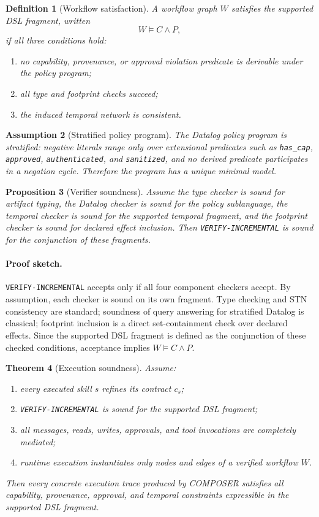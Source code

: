 \documentclass[11pt]{article}
\newtheorem{definition}{Definition}[section]
\newtheorem{assumption}[definition]{Assumption}
\newtheorem{proposition}[definition]{Proposition}
\newtheorem{theorem}[definition]{Theorem}
\begin{document}
\begin{definition}[Workflow satisfaction]
A workflow graph $W$ satisfies the supported DSL fragment, written
\[
W \models C \land P,
\]
if all three conditions hold:
\begin{enumerate}
\item no capability, provenance, or approval violation predicate is derivable under the policy program;
\item all type and footprint checks succeed;
\item the induced temporal network is consistent.
\end{enumerate}
\end{definition}

\begin{assumption}[Stratified policy program]
The Datalog policy program is stratified: negative literals range only over extensional predicates such as \texttt{has\_cap}, \texttt{approved}, \texttt{authenticated}, and \texttt{sanitized}, and no derived predicate participates in a negation cycle. Therefore the program has a unique minimal model.
\end{assumption}

\begin{proposition}[Verifier soundness]
Assume the type checker is sound for artifact typing, the Datalog checker is sound for the policy sublanguage, the temporal checker is sound for the supported temporal fragment, and the footprint checker is sound for declared effect inclusion. Then \texttt{VERIFY-INCREMENTAL} is sound for the conjunction of these fragments.
\end{proposition}

\paragraph{Proof sketch.}
\texttt{VERIFY-INCREMENTAL} accepts only if all four component checkers accept. By assumption, each checker is sound on its own fragment. Type checking and STN consistency are standard; soundness of query answering for stratified Datalog is classical; footprint inclusion is a direct set-containment check over declared effects. Since the supported DSL fragment is defined as the conjunction of these checked conditions, acceptance implies $W \models C \land P$.

\begin{theorem}[Execution soundness]
Assume:
\begin{enumerate}
\item every executed skill $s$ refines its contract $c_s$;
\item \texttt{VERIFY-INCREMENTAL} is sound for the supported DSL fragment;
\item all messages, reads, writes, approvals, and tool invocations are completely mediated;
\item runtime execution instantiates only nodes and edges of a verified workflow $W$.
\end{enumerate}
Then every concrete execution trace produced by COMPOSER satisfies all capability, provenance, approval, and temporal constraints expressible in the supported DSL fragment.
\end{theorem}
\end{document}
